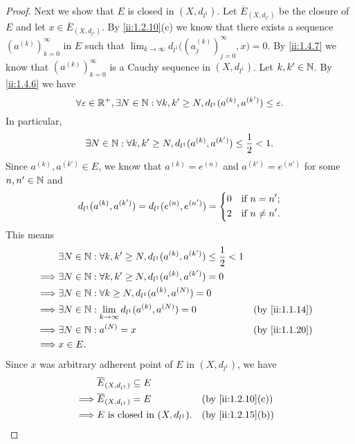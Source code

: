 \begin{proof}
  Next we show that \(E\) is closed in \((X, d_{l^1})\).
  Let \(\overline{E}_{(X, d_{l^1})}\) be the closure of \(E\) and let \(x \in \overline{E}_{(X, d_{l^1})}\).
  By \cref{ii:1.2.10}(c) we know that there exists a sequence \((a^{(k)})_{k = 0}^\infty\) in \(E\) such that \(\lim_{k \to \infty} d_{l^1}\big((a_j^{(k)})_{j = 0}^\infty, x\big) = 0\).
  By \cref{ii:1.4.7} we know that \((a^{(k)})_{k = 0}^\infty\) is a Cauchy sequence in \((X, d_{l^1})\).
  Let \(k, k' \in \mathbb{N}\).
  By \cref{ii:1.4.6} we have
  \[
    \forall \varepsilon \in \mathbb{R}^+, \exists N \in \mathbb{N} : \forall k, k' \geq N, d_{l^1}(a^{(k)}, a^{(k')}) \leq \varepsilon.
  \]
  In particular,
  \[
    \exists N \in \mathbb{N} : \forall k, k' \geq N, d_{l^1}(a^{(k)}, a^{(k')}) \leq \dfrac{1}{2} < 1.
  \]
  Since \(a^{(k)}, a^{(k')} \in E\), we know that \(a^{(k)} = e^{(n)}\) and \(a^{(k')} = e^{(n')}\) for some \(n, n' \in \mathbb{N}\) and
  \[
    d_{l^1}(a^{(k)}, a^{(k')}) = d_{l^1}(e^{(n)}, e^{(n')}) = \begin{dcases}
      0 & \text{if } n = n';    \\
      2 & \text{if } n \neq n'.
    \end{dcases}
  \]
  This means
  \begin{align*}
             & \exists N \in \N : \forall k, k' \geq N, d_{l^1}(a^{(k)}, a^{(k')}) \leq \dfrac{1}{2} < 1                     \\
    \implies & \exists N \in \N : \forall k, k' \geq N, d_{l^1}(a^{(k)}, a^{(k')}) = 0                                       \\
    \implies & \exists N \in \N : \forall k \geq N, d_{l^1}(a^{(k)}, a^{(N)}) = 0                                            \\
    \implies & \exists N \in \N : \lim_{k \to \infty} d_{l^1}(a^{(k)}, a^{(N)}) = 0                      &  & \by{ii:1.1.14} \\
    \implies & \exists N \in \N : a^{(N)} = x                                                            &  & \by{ii:1.1.20} \\
    \implies & x \in E.
  \end{align*}
  Since \(x\) was arbitrary adherent point of \(E\) in \((X, d_{l^1})\), we have
  \begin{align*}
             & \overline{E}_{(X, d_{l^1})} \subseteq E                        \\
    \implies & \overline{E}_{(X, d_{l^1})} = E         &  & \by{ii:1.2.10}[c] \\
    \implies & E \text{ is closed in } (X, d_{l^1}).   &  & \by{ii:1.2.15}[b]
  \end{align*}


\end{proof}
